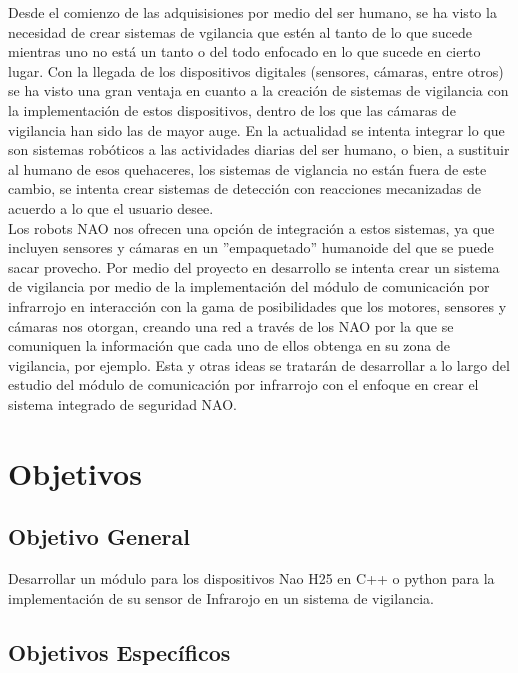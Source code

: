 \documentclass[letterpaper]{article}
\begin{document}
Desde el comienzo de las adquisisiones por medio del ser humano, se ha visto la necesidad de crear sistemas de vgilancia que estén
al tanto de lo que sucede mientras uno no está un tanto o del todo enfocado en lo que sucede en cierto lugar. Con la llegada
de los dispositivos digitales (sensores, cámaras, entre otros) se ha visto una gran ventaja en cuanto a la creación de 
sistemas de vigilancia con la implementación de estos dispositivos, dentro de los que las cámaras de vigilancia han sido las de 
mayor auge. En la actualidad se intenta integrar lo que son sistemas robóticos a las actividades diarias del ser humano, o bien, a 
sustituir al humano de esos quehaceres, los sistemas de viglancia no están fuera de este cambio, se intenta crear sistemas de 
detección con reacciones mecanizadas de acuerdo a lo que el usuario desee.
\\ Los robots NAO nos ofrecen una opción de integración a estos sistemas, ya que incluyen sensores y cámaras en un ''empaquetado''
humanoide del que se puede sacar provecho. Por medio del proyecto en desarrollo se intenta crear un sistema de vigilancia
por medio de la implementación del módulo de comunicación por infrarrojo en interacción con la gama de posibilidades
que los motores, sensores y cámaras nos otorgan, creando una red a través de los NAO por la que se comuniquen la información
que cada uno de ellos obtenga en su zona de vigilancia, por ejemplo. Esta y otras ideas se tratarán de desarrollar a lo largo
del estudio del módulo de comunicación por infrarrojo con el enfoque en crear el sistema integrado de seguridad NAO.
\section{Objetivos}

\subsection{Objetivo General}

Desarrollar un módulo para los dispositivos Nao H25 en C++ o python para la implementación de su sensor de Infrarojo en un sistema de vigilancia. 

\subsection{Objetivos Específicos}
\end{document}
